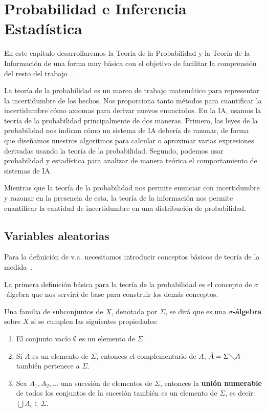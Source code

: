 \chapter{Probabilidad e Inferencia Estadística}\label{sec:inferencia}
En este capítulo desarrollaremos la Teoría de la Probabilidad y la Teoría de la Información de una forma muy básica con el objetivo de facilitar la comprensión del resto del trabajo~\cite{Goodfellow-et-al-2016}.

La teoría de la probabilidad es un marco de trabajo matemático para representar la incertidumbre de los hechos. Nos proporciona tanto métodos para cuantificar la incertidumbre cómo axiomas para derivar nuevos enunciados. En la \ac{IA}, usamos la teoría de la probabilidad principalmente de dos maneras. Primero, las leyes de la probabilidad nos indican cómo un sistema de \ac{IA} debería de razonar, de forma que diseñamos nuestros algoritmos para calcular o aproximar varias expresiones derivadas usando la teoría de la probabilidad. Segundo, podemos usar probabilidad y estadística para analizar de manera teórica el comportamiento de sistemas de \ac{IA}.

Mientras que la teoría de la probabilidad nos permite enunciar con incertidumbre y razonar en la presencia de esta, la teoría de la información nos permite cuantificar la cantidad de incertidumbre en una distribución de probabilidad.

\section{Variables aleatorias}
Para la definición de \ac{v.a.} necesitamos introducir conceptos básicos de teoría de la medida~\cite{ross-2019}.

La primera definición básica para la teoría de la probabilidad es el concepto de $\sigma$-álgebra que nos servirá de base para construir los demás conceptos.

\begin{definition}
    Una familia de subconjuntos de $X$, denotada por $\Sigma$, se dirá que es una \textbf{$\sigma$-álgebra} sobre $X$ si se cumplen las siguientes propiedades:
    \begin{enumerate}
        \item El conjunto vacío $\emptyset$ es un elemento de $\Sigma$.
        \item Si $A$ es un elemento de $\Sigma$, entonces el complementario de $A$, $\bar{A}=\Sigma \diagdown A$ también pertenece a $\Sigma$.
        \item Sea $A_1, A_2, \ldots$ una sucesión de elementos de $\Sigma$, entonces la \textbf{unión numerable} de todos los conjuntos de la sucesión también es un elemento de $\Sigma$, es decir: $\bigcup A_i \in \Sigma$.
    \end{enumerate}
\end{definition}

